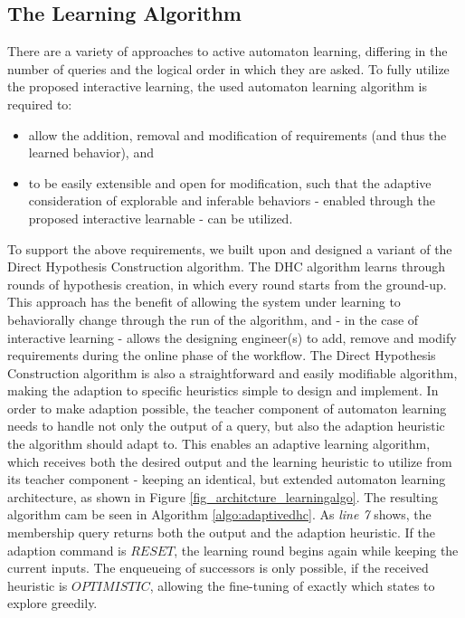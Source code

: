 \subsection{The Learning Algorithm} \label{subs_dhcintheframework}

There are a variety of approaches to active automaton learning, differing in the number of queries and the logical order in which they are asked. To fully utilize the proposed interactive learning, the used automaton learning algorithm is required to:

\begin{itemize}
	\item allow the addition, removal and modification of requirements (and thus the learned behavior), and
	\item to be easily extensible and open for modification, such that the adaptive consideration of explorable and inferable behaviors - enabled through the proposed interactive learnable - can be utilized.
\end{itemize}

To support the above requirements, we built upon and designed a variant of the Direct Hypothesis Construction algorithm. The DHC algorithm learns through rounds of hypothesis creation, in which every round starts from the ground-up. This approach has the benefit of allowing the system under learning to behaviorally change through the run of the algorithm, and - in the case of interactive learning - allows the designing engineer(s) to add, remove and modify requirements during the online phase of the workflow. The Direct Hypothesis Construction algorithm is also a straightforward and easily modifiable algorithm, making the adaption to specific heuristics simple to design and implement. In order to make adaption possible, the teacher component of automaton learning needs to handle not only the output of a query, but also the adaption heuristic the algorithm should adapt to. This enables an adaptive learning algorithm, which receives both the desired output and the learning heuristic to utilize from its teacher component - keeping an identical, but extended automaton learning architecture, as shown in Figure \ref{fig_architcture_learningalgo}. The resulting algorithm cam be seen in Algorithm \ref{algo:adaptivedhc}. As \textit{line 7} shows, the membership query returns both the output and the adaption heuristic. If the adaption command is $RESET$, the learning round begins again while keeping the current inputs. The enqueueing of successors is only possible, if the received heuristic is $OPTIMISTIC$, allowing the fine-tuning of exactly which states to explore greedily.

